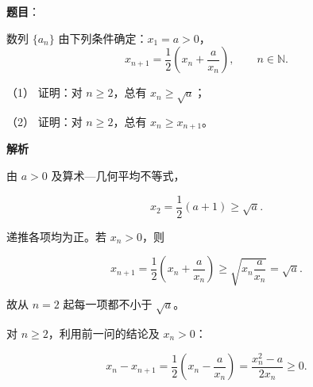 \begin{answer}

\textbf{题目}：

数列 \(\{a_n\}\) 由下列条件确定：\(x_1=a>0\)，
\nopagebreak[4]
\[
x_{n+1}=\frac12\left(x_n+\frac{a}{x_n}\right),\qquad n\in\mathbb N.
\]

（1） 证明：对 \(n\geqslant2\)，总有 \(x_n\geqslant\sqrt a\)；

（2） 证明：对 \(n\geqslant2\)，总有 \(x_n\geqslant x_{n+1}\)。

\textbf{解析}


由 $a>0$ 及算术—几何平均不等式，

\nopagebreak[4]
\[x_2=\frac12\left(a+1\right)\ge\sqrt a.\]

递推各项均为正。若 $x_n>0$，则

\nopagebreak[4]
\[x_{n+1}=\frac12\left(x_n+\frac a{x_n}\right)\ge\sqrt{x_n\frac a{x_n}}=\sqrt a.\]

故从 $n=2$ 起每一项都不小于 $\sqrt a$。


对 $n\ge2$，利用前一问的结论及 $x_n>0$：

\nopagebreak[4]
\[x_n-x_{n+1}=\frac12\left(x_n-\frac a{x_n}\right)
=\frac{x_n^2-a}{2x_n}\ge0.\]



\end{answer}

